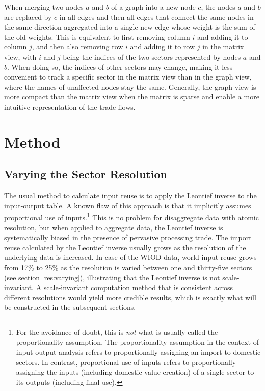 \documentclass[english]{uzhpub}
\begin{document}
When merging two nodes $a$ and $b$ of a graph into a new node $c$, the nodes $a$ and $b$ are replaced by $c$ in all edges and then all edges that connect the same nodes in the same direction aggregated into a single new edge whose weight is the sum of the old weights. This is equivalent to first removing column $i$ and adding it to column $j$, and then also removing row $i$ and adding it to row $j$ in the matrix view, with $i$ and $j$ being the indices of the two sectors represented by nodes $a$ and $b$. When doing so, the indices of other sectors may change, making it less convenient to track a specific sector in the matrix view than in the graph view, where the names of unaffected nodes stay the same. Generally, the graph view is more compact than the matrix view when the matrix is sparse and enable a more intuitive representation of the trade flows.

\section{Method}
\label{sec:method}

\subsection{Varying the Sector Resolution}
\label{Varying}
The usual method to calculate input reuse is to apply the Leontief inverse to the input-output table. A known flaw of this approach is that it implicitly assumes proportional use of inputs.\footnote{For the avoidance of doubt, this is \emph{not} what is usually called the proportionality assumption. The proportionality assumption in the context of input-output analysis refers to proportionally assigning an import to domestic sectors. In contrast, proportional use of inputs refers to proportionally assigning the inputs (including domestic value creation) of a single sector to its outputs (including final use).} This is no problem for disaggregate data with atomic resolution, but when applied to aggregate data, the Leontief inverse is systematically biased in the presence of pervasive processing trade. The import reuse calculated by the Leontief inverse usually grows as the resolution of the underlying data is increased. In case of the WIOD data, world input reuse grows from 17\% to 25\% as the resolution is varied between one and thirty-five sectors (see section \ref{res:varying}), illustrating that the Leontief inverse is not scale-invariant. A scale-invariant computation method that is consistent across different resolutions would yield more credible results, which is exactly what will be constructed in the subsequent sections.
\end{document}
